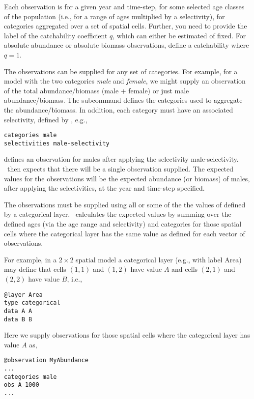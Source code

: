 {{Each observation is for a given year and time-step, for some selected age classes of the population (i.e., for a range of ages multiplied by a selectivity), for categories aggregated over a set of spatial cells. Further, you need to provide the label of the catchability coefficient $q$, which can either be estimated of fixed. For absolute abundance or absolute biomass observations, define a catchability where $q=1$.

The observations can be supplied for any set of categories. For example, for a model with the two categories \emph{male} and \emph{female}, we might supply an observation of the total abundance/biomass (male $+$ female) or just male abundance/biomass. The subcommand  defines the categories used to aggregate the abundance/biomass. In addition, each category must have an associated selectivity, defined by , e.g., 

{\small{\begin{verbatim}
categories male
selectivities male-selectivity
\end{verbatim}}}

defines an observation for males after applying the selectivity male-selectivity. \SPM\ then expects that there will be a single observation supplied. The expected values for the observations will be the expected abundance (or biomass) of males, after applying the selectivities, at the year and time-step specified. 

The observations must be supplied using all or some of the the values of defined by a categorical layer. \SPM\ calculates the expected values by summing over the defined ages (via the age range and selectivity) and categories for those spatial cells where the categorical layer has the same value as defined for each vector of observations.

For example, in a $2 \times 2$ spatial model a categorical layer (e.g., with label Area) may define that cells $(1,1)$ and $(1,2)$ have value $A$ and cells $(2,1)$ and $(2,2)$ have value $B$, i.e.,

{\small{\begin{verbatim}
@layer Area
type categorical
data A A 
data B B
\end{verbatim}}}

Here we supply observations for those spatial cells where the categorical layer has value $A$ as, 

{\small{\begin{verbatim}
@observation MyAbundance
...
categories male 
obs A 1000
...
\end{verbatim}}}

}}
